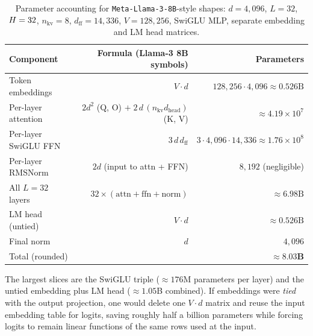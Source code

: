 \begin{table}[htbp]
\noindent
\small
\begin{tabular}{@{}lrr@{}}
\toprule
Component & Formula (Llama-3 8B symbols) & Parameters \\
\midrule
Token embeddings & \(V \cdot d\) & \(128{,}256 \cdot 4{,}096 \approx 0.526\text{B}\) \\
Per-layer attention & \(2 d^{2}\) (Q, O) \(+\;2\,d\,(n_{\text{kv}} d_{\text{head}})\) (K, V) &
  \(\approx 4.19\times 10^{7}\) \\
Per-layer SwiGLU FFN & \(3\,d\,d_{\text{ff}}\) &
  \(3\cdot 4{,}096\cdot 14{,}336 \approx 1.76\times 10^{8}\) \\
Per-layer RMSNorm & \(2d\) (input to attn + FFN) & \(8{,}192\) (negligible) \\
All \(L=32\) layers & \(32 \times (\text{attn}+\text{ffn}+\text{norm})\) &
  \(\approx 6.98\text{B}\) \\
LM head (untied) & \(V \cdot d\) & \(\approx 0.526\text{B}\) \\
Final norm & \(d\) & \(4{,}096\) \\
\midrule
Total (rounded) & & \(\mathbf{\approx 8.03\text{B}}\) \\
\bottomrule
\end{tabular}
\caption{Parameter accounting for \texttt{Meta-Llama-3-8B}-style shapes:
\(d=4{,}096\), \(L=32\), \(H=32\), \(n_{\text{kv}}=8\),
\(d_{\text{ff}}=14{,}336\), \(V=128{,}256\), SwiGLU MLP, separate embedding and
LM head matrices.}
\label{tab:llama8b-params}
\end{table}

\noindent
The largest slices are the SwiGLU triple (\(\approx 176\)M parameters per layer)
and the untied embedding plus LM head (\(\approx 1.05\)B combined). If embeddings
were \emph{tied} with the output projection, one would delete one \(V\!\cdot\!d\)
matrix and reuse the input embedding table for logits, saving roughly half a
billion parameters while forcing logits to remain linear functions of the same
rows used at the input.

